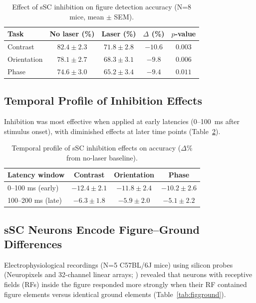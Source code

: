 \documentclass[11pt]{article}
\begin{document}
\begin{table}[H]
\centering
\caption{Effect of sSC inhibition on figure detection accuracy (N=8 mice, mean $\pm$ SEM).}
\label{tab:optobehavior}
\begin{tabular}{lcccc}
\toprule
\textbf{Task} & \textbf{No laser (\%)} & \textbf{Laser (\%)} & \textbf{$\Delta$ (\%)} & \textbf{$p$-value} \\
\midrule
Contrast & $82.4 \pm 2.3$ & $71.8 \pm 2.8$ & $-10.6$ & $0.003$ \\
Orientation & $78.1 \pm 2.7$ & $68.3 \pm 3.1$ & $-9.8$ & $0.006$ \\
Phase & $74.6 \pm 3.0$ & $65.2 \pm 3.4$ & $-9.4$ & $0.011$ \\
\bottomrule
\end{tabular}
\end{table}

\subsection{Temporal Profile of Inhibition Effects}

Inhibition was most effective when applied at early latencies (0--100~ms after stimulus onset), with diminished effects at later time points (Table~\ref{tab:temporal}).

\begin{table}[H]
\centering
\caption{Temporal profile of sSC inhibition effects on accuracy ($\Delta$\% from no-laser baseline).}
\label{tab:temporal}
\begin{tabular}{lccc}
\toprule
\textbf{Latency window} & \textbf{Contrast} & \textbf{Orientation} & \textbf{Phase} \\
\midrule
0--100 ms (early) & $-12.4 \pm 2.1$ & $-11.8 \pm 2.4$ & $-10.2 \pm 2.6$ \\
100--200 ms (late) & $-6.3 \pm 1.8$ & $-5.9 \pm 2.0$ & $-5.1 \pm 2.2$ \\
\bottomrule
\end{tabular}
\end{table}

\subsection{sSC Neurons Encode Figure--Ground Differences}

Electrophysiological recordings (N=5 C57BL/6J mice) using silicon probes (Neuropixels and 32-channel linear arrays; \citealt{jun2017neuropixels}) revealed that neurons with receptive fields (RFs) inside the figure responded more strongly when their RF contained figure elements versus identical ground elements (Table~\ref{tab:figground}).
\end{document}
